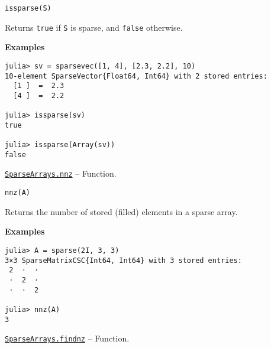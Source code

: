 \begin{adjustwidth}{2em}{0pt}


\begin{verbatim}
issparse(S)
\end{verbatim}

Returns \texttt{true} if \texttt{S} is sparse, and \texttt{false} otherwise.

\textbf{Examples}


\begin{verbatim}
julia> sv = sparsevec([1, 4], [2.3, 2.2], 10)
10-element SparseVector{Float64, Int64} with 2 stored entries:
  [1 ]  =  2.3
  [4 ]  =  2.2

julia> issparse(sv)
true

julia> issparse(Array(sv))
false
\end{verbatim}



\end{adjustwidth}
\hypertarget{4231069364201374387}{}
\hyperlink{4231069364201374387}{\texttt{SparseArrays.nnz}}  -- {Function.}

\begin{adjustwidth}{2em}{0pt}


\begin{verbatim}
nnz(A)
\end{verbatim}

Returns the number of stored (filled) elements in a sparse array.

\textbf{Examples}


\begin{verbatim}
julia> A = sparse(2I, 3, 3)
3×3 SparseMatrixCSC{Int64, Int64} with 3 stored entries:
 2  ⋅  ⋅
 ⋅  2  ⋅
 ⋅  ⋅  2

julia> nnz(A)
3
\end{verbatim}



\end{adjustwidth}
\hypertarget{15430174447643444721}{}
\hyperlink{15430174447643444721}{\texttt{SparseArrays.findnz}}  -- {Function.}

